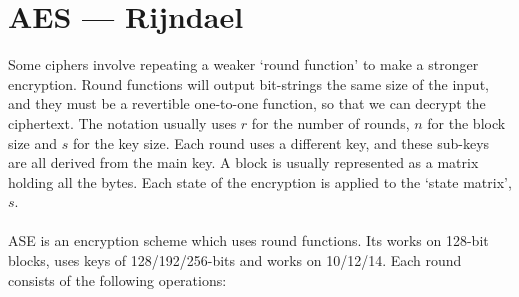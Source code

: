 \section{AES --- Rijndael}
    Some ciphers involve repeating a weaker `round function' to make a stronger encryption. Round functions will output bit-strings the same size of the input, and they must be a revertible one-to-one function, so that we can decrypt the ciphertext. The notation usually uses $r$ for the number of rounds, $n$ for the block size and $s$ for the key size. Each round uses a different key, and these sub-keys are all derived from the main key. A block is usually represented as a matrix holding all the bytes. Each state of the encryption is applied to the `state matrix', $s$.\\
    \\
    ASE is an encryption scheme which uses round functions. Its works on 128-bit blocks, uses keys of 128/192/256-bits and works on 10/12/14. Each round consists of the following operations:\\
    \\
    \newcommand{\leftminipagewidth}{0.3\textwidth}
    \newcommand{\rightminipagewidth}{0.7\textwidth}
